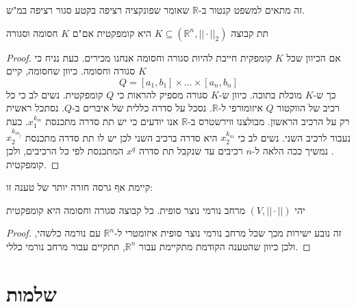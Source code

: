 \documentclass{tstextbook}
\begin{document}
\begin{remark}
זה מתאים למשפט קנטור ב-\(\mathbb{R}\) שאומר שפונקציה רציפה בקטע סגור רציפה במ"ש.

\end{remark}
\begin{theorem}
תת קבוצה \(K\subseteq\left( \mathbb{R} ^n,||\cdot||_{2} \right)\) היא קומפקטית אם"ם \(K\) חסומה וסגורה

\end{theorem}
\begin{proof}
אם הכיוון שכל \(K\) קומפקית חייבת להיות סגורה וחסומה אנחנו מכירים. כעת נניח כי \(K\) סגורה וחסומה. כיוון שחסומה, קיים $$Q=[a_{1},b_{1}]\times\ldots\times[a_{n},b_{n}]$$
כך ש-\(K\) מוכלת בתוכה. כיוון ש-\(K\) סגורה מספיק להראות כי \(Q\) קומפקטית. נשים לב כי כל רכיב של הווקטור \(Q\) איזומורפי ל-\(\mathbb{R}\). נסכל על סדרה כללית של איברים ב-\(Q\). נסתכל ראשית רק על הרכיב הראשון. מבולצנו ווירשטרס ב-\(\mathbb{R}\) אנו יודעים כי יש תת סדרה מתכנסת \(x_{1}^{k_{m}}\). כעת נעבור לרכיב השני. נשים לב כי \(x_{2}^{k_{m}}\) היא סדרה ברכיב השני לכן יש לו תת סדרה מתכנסת \(x_{2}^{k_{m_{j}}}\). נמשיך ככה הלאה ל-\(n\) רכיבים עד שנקבל תת סדרה \(x^{q}\) המתכנסת לפי כל הרכיבים, ולכן קומפקטית.

\end{proof}
קיימת אף גרסה חזרה יותר של טענה זו:

\begin{proposition}
יהי \(\left( V,||\cdot|| \right)\) מרחב נורמי נוצר סופית. כל קבוצה סגורה וחסומה היא קומפקטית

\end{proposition}
\begin{proof}
זה נובע ישירות מכך שכל מרחב נורמי נוצר סופית איזומטרי ל-\(\mathbb{R}^n\) עם נורמה כלשהי, ולכן כיוון שהטענה הקודמת מתקיימת עבור \(\mathbb{R}^n\), תתקיים עבור מרחב נורמי כללי.

\end{proof}
\section{שלמות}
\end{document}
